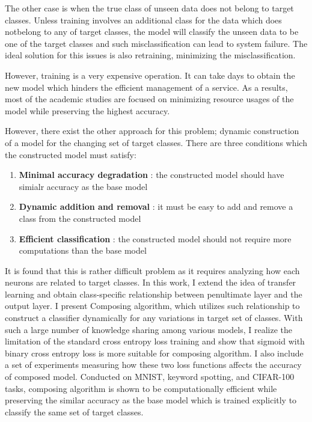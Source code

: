 \documentclass{article}
\begin{document}
The other case is when the true class of unseen data does not belong to target classes. Unless training involves an additional class for the data which does notbelong to any of target classes, the model will classify the unseen data to be one of the target classes and such misclassification can lead to system failure. The ideal solution for this issues is also retraining, minimizing the misclassification.

However, training is a very expensive operation. It can take days to obtain the new model which hinders the efficient management of a service. As a results, most of the academic studies are focused on minimizing resource usages of the model while preserving the highest accuracy.

However, there exist the other approach for this problem; dynamic construction of a model for the changing set of target classes. There are three conditions which the constructed model must satisfy:

\begin{enumerate}
    \item \textbf{Minimal accuracy degradation} : the constructed model should have simialr accuracy as the base model
    \item \textbf{Dynamic addition and removal} : it must be easy to add and remove a class from the constructed model
    \item \textbf{Efficient classification} : the constructed model should not require more computations than the base model
\end{enumerate}

It is found that this is rather difficult problem as it requires analyzing how each neurons are related to target classes. In this work, I extend the idea of transfer learning and obtain class-specific relationship between penultimate layer and the output layer. I present Composing algorithm, which utilizes such relationship to construct a classifier dynamically for any variations in target set of classes. With such a large number of knowledge sharing among various models, I realize the limitation of the standard cross entropy loss training and show that sigmoid with binary cross entropy loss is more suitable for composing algorithm. I also include a set of experiments measuring how these two loss functions affects the accuracy of composed model. Conducted on MNIST, keyword spotting, and CIFAR-100 tasks, composing algorithm is shown to be computationally efficient while preserving the similar accuracy as the base model which is trained explicitly to classify the same set of target classes.
\end{document}
